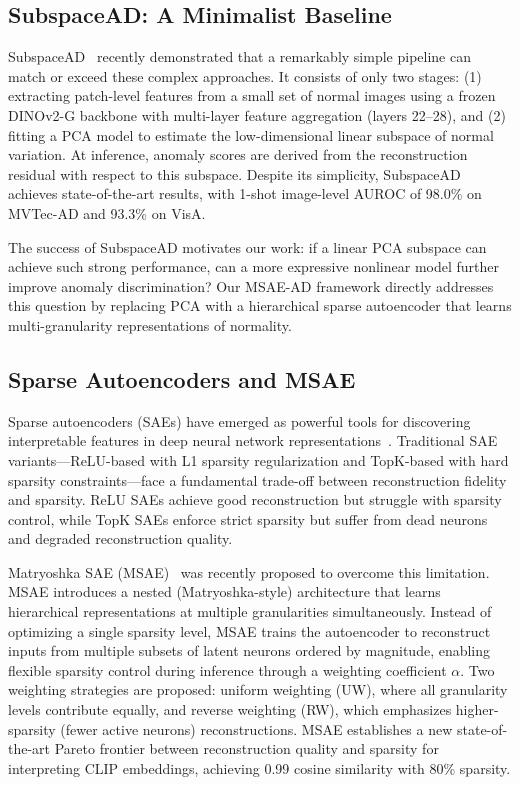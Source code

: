 \subsection{SubspaceAD: A Minimalist Baseline}

SubspaceAD~\cite{Lendering2025SubspaceAD} recently demonstrated that a remarkably simple pipeline can match or exceed these complex approaches.
It consists of only two stages: (1) extracting patch-level features from a small set of normal images using a frozen DINOv2-G backbone with multi-layer feature aggregation (layers 22--28), and (2) fitting a PCA model to estimate the low-dimensional linear subspace of normal variation.
At inference, anomaly scores are derived from the reconstruction residual with respect to this subspace.
Despite its simplicity, SubspaceAD achieves state-of-the-art results, with 1-shot image-level AUROC of 98.0\% on MVTec-AD and 93.3\% on VisA.

The success of SubspaceAD motivates our work: if a linear PCA subspace can achieve such strong performance, can a more expressive nonlinear model further improve anomaly discrimination?
Our MSAE-AD framework directly addresses this question by replacing PCA with a hierarchical sparse autoencoder that learns multi-granularity representations of normality.

\subsection{Sparse Autoencoders and MSAE}

Sparse autoencoders (SAEs) have emerged as powerful tools for discovering interpretable features in deep neural network representations~\cite{Bricken2023SAE,Templeton2024SAE}.
Traditional SAE variants---ReLU-based with L1 sparsity regularization and TopK-based with hard sparsity constraints---face a fundamental trade-off between reconstruction fidelity and sparsity.
ReLU SAEs achieve good reconstruction but struggle with sparsity control, while TopK SAEs enforce strict sparsity but suffer from dead neurons and degraded reconstruction quality.

Matryoshka SAE (MSAE)~\cite{Zaigrajew2025MSAE} was recently proposed to overcome this limitation.
MSAE introduces a nested (Matryoshka-style) architecture that learns hierarchical representations at multiple granularities simultaneously.
Instead of optimizing a single sparsity level, MSAE trains the autoencoder to reconstruct inputs from multiple subsets of latent neurons ordered by magnitude, enabling flexible sparsity control during inference through a weighting coefficient $\alpha$.
Two weighting strategies are proposed: uniform weighting (UW), where all granularity levels contribute equally, and reverse weighting (RW), which emphasizes higher-sparsity (fewer active neurons) reconstructions.
MSAE establishes a new state-of-the-art Pareto frontier between reconstruction quality and sparsity for interpreting CLIP embeddings, achieving 0.99 cosine similarity with 80\% sparsity.

